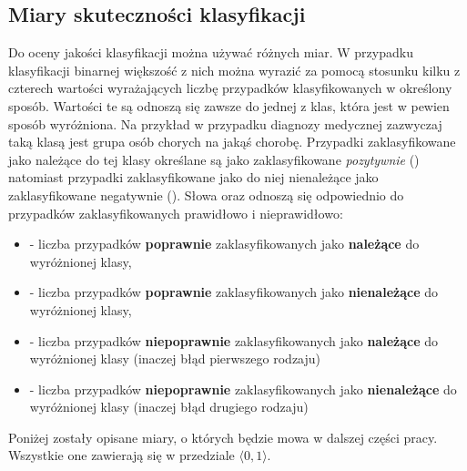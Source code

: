 \subsection{Miary skuteczności klasyfikacji}\label{sec:measures}
	Do oceny jakości klasyfikacji można używać różnych miar. W przypadku klasyfikacji binarnej większość z nich można wyrazić za pomocą stosunku kilku z czterech wartości wyrażających liczbę przypadków klasyfikowanych w określony sposób. Wartości te są odnoszą się zawsze do jednej z klas, która jest w pewien sposób wyróżniona. Na przykład w przypadku diagnozy medycznej zazwyczaj taką klasą jest grupa osób chorych na jakąś chorobę. Przypadki zaklasyfikowane jako należące do tej klasy określane są jako zaklasyfikowane \textit{pozytywnie} () natomiast przypadki zaklasyfikowane jako do niej nienależące jako zaklasyfikowane negatywnie (). Słowa  oraz  odnoszą się odpowiednio do przypadków zaklasyfikowanych prawidłowo i nieprawidłowo:
	\begin{itemize}
		\item {} - liczba przypadków \textbf{poprawnie} zaklasyfikowanych jako \textbf{należące} do wyróżnionej klasy,
		\item  {} - liczba przypadków \textbf{poprawnie} zaklasyfikowanych jako \textbf{nienależące} do wyróżnionej klasy,
		\item {} - liczba przypadków \textbf{niepoprawnie} zaklasyfikowanych jako \textbf{należące} do wyróżnionej klasy (inaczej błąd pierwszego rodzaju)
		\item {} - liczba przypadków \textbf{niepoprawnie} zaklasyfikowanych jako \textbf{nienależące} do wyróżnionej klasy (inaczej błąd drugiego rodzaju)
	\end{itemize}		
	
	 Poniżej zostały opisane miary, o których będzie mowa w dalszej części pracy. Wszystkie one zawierają się w przedziale $ \langle 0,1 \rangle $.

